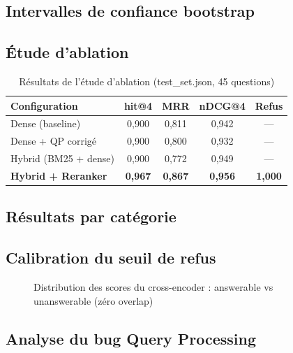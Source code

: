 \documentclass{rapportECL}
\begin{document}
\subsection{Intervalles de confiance bootstrap}

\subsection{Étude d'ablation}

\begin{table}[H]
\centering
\caption{Résultats de l'étude d'ablation (test\_set.json, 45 questions)}
\label{tab:ablation}
\begin{tabular}{lcccc}
\toprule
\textbf{Configuration} & \textbf{hit@4} & \textbf{MRR} & \textbf{nDCG@4} & \textbf{Refus} \\
\midrule
Dense (baseline)      & 0,900 & 0,811 & 0,942 & — \\
Dense + QP corrigé     & 0,900 & 0,800 & 0,932 & — \\
Hybrid (BM25 + dense)  & 0,900 & 0,772 & 0,949 & — \\
\textbf{Hybrid + Reranker} & \textbf{0,967} & \textbf{0,867} & \textbf{0,956} & \textbf{1,000} \\
\bottomrule
\end{tabular}
\end{table}

\subsection{Résultats par catégorie}

\subsection{Calibration du seuil de refus}

\begin{figure}[H]
\centering
\caption{Distribution des scores du cross-encoder : answerable vs unanswerable (zéro overlap)}
\label{fig:calibration}
\end{figure}

\subsection{Analyse du bug Query Processing}

\end{document}
